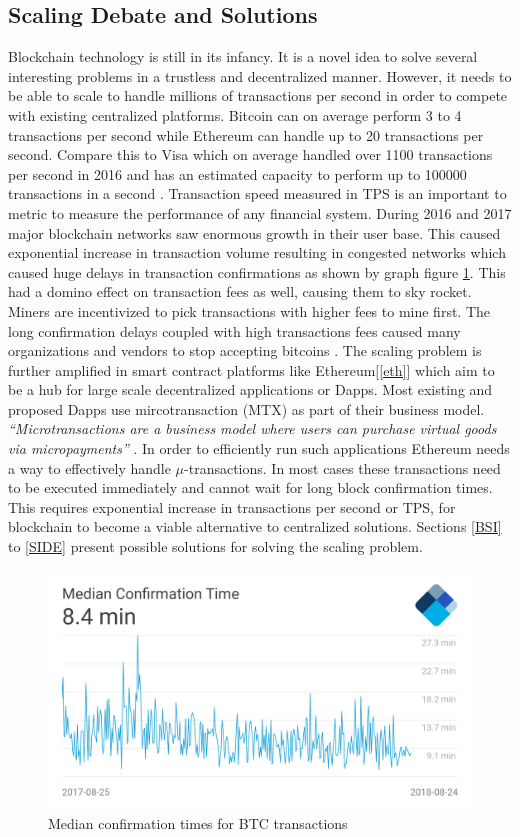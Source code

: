 \subsection{Scaling Debate and Solutions}\label{scaling}
Blockchain technology is still in its infancy. It is a novel idea to solve several interesting problems in a trustless and decentralized manner. However, it needs to be able to scale to handle millions of transactions per second in order to compete with existing centralized platforms. Bitcoin can on average perform 3 to 4 transactions per second while Ethereum can handle up to 20 transactions per second. Compare this to Visa which on average handled over 1100 transactions per second in 2016 and has an estimated capacity to perform up to 100000 transactions in a second \cite{medium:003}. Transaction speed measured in TPS is an important to metric to measure the performance of any financial system. During 2016 and 2017 major blockchain networks saw enormous growth in their user base. This caused exponential increase in transaction volume resulting in congested networks which caused huge delays in transaction confirmations as shown by graph figure \ref{fig:mct}. This had a domino effect on transaction fees as well, causing them to sky rocket. Miners are incentivized to pick transactions with higher fees to mine first. The long confirmation delays coupled with high transactions fees caused many organizations and vendors to stop accepting bitcoins \cite{misc:022}. The scaling problem is further amplified in smart contract platforms like Ethereum[\ref{eth}] which aim to be a hub for large scale decentralized applications or Dapps. Most existing and proposed Dapps use mircotransaction (MTX) as part of their business model. \textit{“Microtransactions are a business model where users can purchase virtual goods via micropayments”} \cite{wiki:007}. In order to efficiently run such applications Ethereum needs a way to effectively handle $\mu$-transactions. In most cases these transactions need to be executed immediately and cannot wait for long block confirmation times. This requires exponential increase in transactions per second or TPS, for blockchain to become a viable alternative to centralized solutions. Sections \ref{BSI} to \ref{SIDE} present possible solutions for solving the scaling problem.

\begin{figure}[h]
	\centering
    \includegraphics[width=120mm,scale=1]{figs/median-confirmation-time}
	\caption{Median confirmation times for BTC transactions \cite{fig:001}}
	\label{fig:mct}
\end{figure}
\vspace{0.5cm}  
